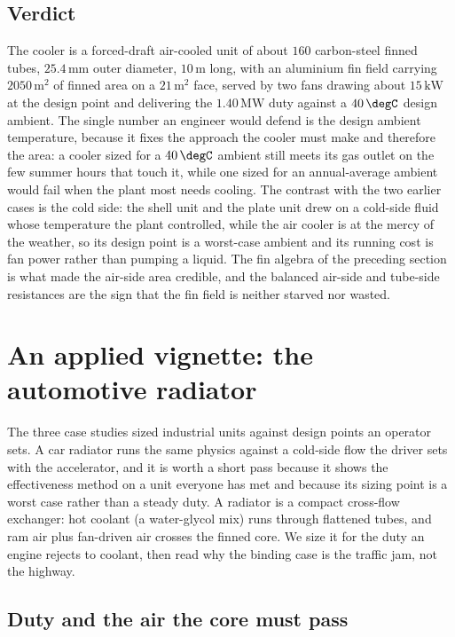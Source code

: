 \subsection{Verdict}

The cooler is a forced-draft air-cooled unit of about $160$ carbon-steel finned
tubes, $25.4\,\si{\milli\meter}$ outer diameter, $10\,\text{m}$ long, with an
aluminium fin field carrying $2050\,\text{m}^2$ of finned area on a
$21\,\text{m}^2$ face, served by two fans drawing about $15\,\text{kW}$ at the
design point and delivering the $1.40\,\text{MW}$ duty against a $40\,\degC$ design
ambient. The single number an engineer would defend is the design ambient
temperature, because it fixes the approach the cooler must make and therefore the
area: a cooler sized for a $40\,\degC$ ambient still meets its gas outlet on the
few summer hours that touch it, while one sized for an annual-average ambient would
fail when the plant most needs cooling. The contrast with the two earlier cases is
the cold side: the shell unit and the plate unit drew on a cold-side fluid whose
temperature the plant controlled, while the air cooler is at the mercy of the
weather, so its design point is a worst-case ambient and its running cost is fan
power rather than pumping a liquid. The fin algebra of the preceding section is
what made the air-side area credible, and the balanced air-side and tube-side
resistances are the sign that the fin field is neither starved nor wasted.

\section{An applied vignette: the automotive radiator}

The three case studies sized industrial units against design points an operator
sets. A car radiator runs the same physics against a cold-side flow the driver
sets with the accelerator, and it is worth a short pass because it shows the
effectiveness method on a unit everyone has met and because its sizing point is a
worst case rather than a steady duty. A radiator is a compact cross-flow exchanger:
hot coolant (a water-glycol mix) runs through flattened tubes, and ram air plus
fan-driven air crosses the finned core. We size it for the duty an engine rejects
to coolant, then read why the binding case is the traffic jam, not the highway.

\subsection{Duty and the air the core must pass}

